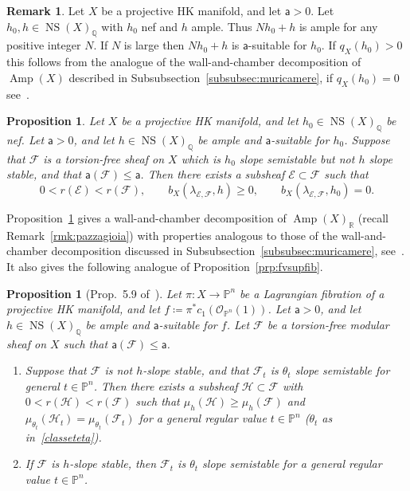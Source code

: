 \documentclass[11pt]{amsart}
\newcommand{\PP}{{\mathbb P}}
\newcommand{\QQ}{{\mathbb Q}}
\newcommand{\RR}{{\mathbb R}}
\let\mathcal\mathscr
\def\cE{\mathcal{E}}
\def\cF{\mathcal{F}}
\def\cH{\mathcal{H}}
\def\cO{\mathcal{O}}
\DeclareMathOperator{\Amp}{Amp}
\DeclareMathOperator{\NS}{NS}
\newtheorem{prp}[lmm]{Proposition}
\theoremstyle{definition}
\newtheorem{rmk}[lmm]{Remark}
\theoremstyle{remark}
\begin{document}
%
\begin{rmk}
%
   Let $X$ be a projective HK manifold, and let ${\mathsf a}> 0$. 
Let $h_0,h\in\NS(X)_{\QQ}$ with $h_0$  nef and $h$ ample. Thus $Nh_0+h$ is ample for any positive integer $N$. 
If $N$ is large  then $Nh_0+h$ is ${\mathsf a}$-suitable for $h_0$. If $q_X(h_0)>0$ this follows from the analogue of the wall-and-chamber decomposition of  $\Amp(X)$ described in
Subsubsection~\ref{subsubsec:muricamere}, if $q_X(h_0)=0$
 see~\cite[Prop~5.13]{og:highdim}.
%
\end{rmk}
%
%
\begin{prp}\label{prp:mirren}
%
Let $X$ be a projective HK manifold, and let  $h_0\in\NS(X)_{\QQ}$ be nef. 
Let  ${\mathsf a}> 0$, and let $h\in\NS(X)_{\QQ}$  be ample and ${\mathsf a}$-suitable for $h_0$. 
 Suppose that  $\cF$ is  a torsion-free  sheaf  on $X$ which  is
  $h_0$ slope semistable  but not $h$ slope stable, and
   that ${\mathsf a}(\cF)\le {\mathsf a}$.  
    Then there exists a subsheaf  $\cE\subset \cF$ such that 
%
\begin{equation}
%
0<r(\cE)<r(\cF),\qquad b_X(\lambda_{\cE,\cF}, h)\ge 0,\qquad b_X(\lambda_{\cE,\cF}, h_0)= 0.
%
\end{equation}
%
\end{prp}
%
Proposition~\ref{prp:mirren} gives a wall-and-chamber decomposition of $\Amp(X)_{\RR}$ (recall Remark~\ref{rmk:pazzagioia}) with properties analogous to those 
of the wall-and-chamber decomposition discussed in Subsubsection~\ref{subsubsec:muricamere}, see~\cite[Prop.~3.4]{og:fascimod}. 
It also gives the following analogue of Proposition~\ref{prp:fvsupfib}.
%
\begin{prp}[Prop.~5.9 of~\cite{og:highdim}]\label{prp:lagstab}
%
Let $\pi\colon X\to\PP^n$ be a  Lagrangian fibration of a projective HK manifold, and let $f\coloneqq \pi^{*}c_1(\cO_{\PP^n}(1))$. Let 
${\mathsf a}>0$, and let $h\in\NS(X)_{\QQ}$ 
 be ample and ${\mathsf a}$-suitable for $f$. Let  $\cF$ be  a torsion-free  modular sheaf  on $X$ such that ${\mathsf a}(\cF)\le {\mathsf a}$.  
\begin{enumerate}
%
\item[(a)]
%
 Suppose that $\cF$ is not $h$-slope stable, and that   $\cF_t$ is $\theta_t$ slope semistable for general $t\in\PP^n$. Then there exists a subsheaf  $\cH\subset \cF$ with $0<r(\cH)<r(\cF)$ such that $\mu_h(\cH)\ge\mu_h(\cF)$ and 
 $\mu_{\theta_t}(\cH_t)=\mu_{\theta_t}(\cF_t)$ for a general regular value $t\in\PP^n$ ($\theta_t$ as in~\eqref{classeteta}).
%
\item[(b)]
%
If  $\cF$ is $h$-slope stable, then $\cF_t$ is $\theta_t$ slope semistable 
 for a general  regular value $t\in\PP^n$. 
%
\end{enumerate}
%
%
\end{prp}
\end{document}
